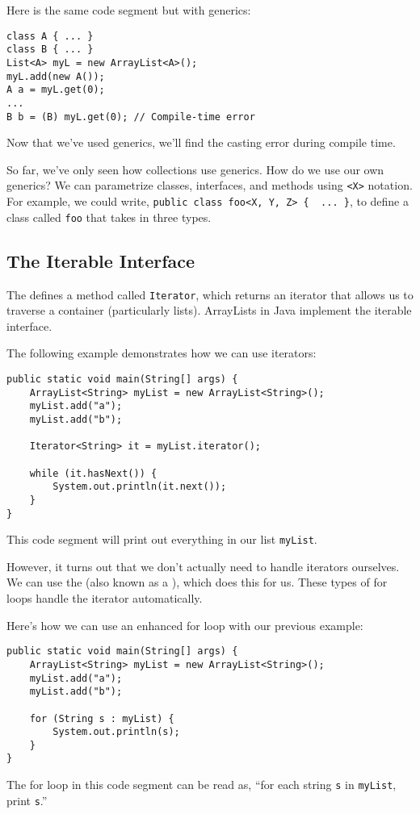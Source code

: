 Here is the same code segment but with generics:

\begin{lstlisting}
class A { ... }
class B { ... }
List<A> myL = new ArrayList<A>();
myL.add(new A());
A a = myL.get(0);
...
B b = (B) myL.get(0); // Compile-time error
\end{lstlisting}

Now that we've used generics, we'll find the casting error during compile time.

So far, we've only seen how collections use generics. How do we use our own generics? We can parametrize classes, interfaces, and methods using \verb!<X>! notation. For example, we could write, \verb!public class foo<X, Y, Z> {  ... }!, to define a class called \verb!foo! that takes in three types. 


\subsection{The Iterable Interface}
The  defines a method called \verb!Iterator!, which returns an iterator that allows us to traverse a container (particularly lists). ArrayLists in Java implement the iterable interface. 

The following example demonstrates how we can use iterators:

\begin{lstlisting}
public static void main(String[] args) {
    ArrayList<String> myList = new ArrayList<String>();
    myList.add("a");
    myList.add("b");
    
    Iterator<String> it = myList.iterator();

    while (it.hasNext()) {
        System.out.println(it.next());
    }
}
\end{lstlisting}

This code segment will print out everything in our list \verb!myList!. 

However, it turns out that we don't actually need to handle iterators ourselves. We can use the  (also known as a ), which does this for us. These types of for loops handle the iterator automatically. 

Here's how we can use an enhanced for loop with our previous example:


\begin{lstlisting}
public static void main(String[] args) {
    ArrayList<String> myList = new ArrayList<String>();
    myList.add("a");
    myList.add("b");
    
    for (String s : myList) {
        System.out.println(s);
    }
}
\end{lstlisting}

The for loop in this code segment can be read as, ``for each string \verb!s! in \verb!myList!, print \verb!s!.''
